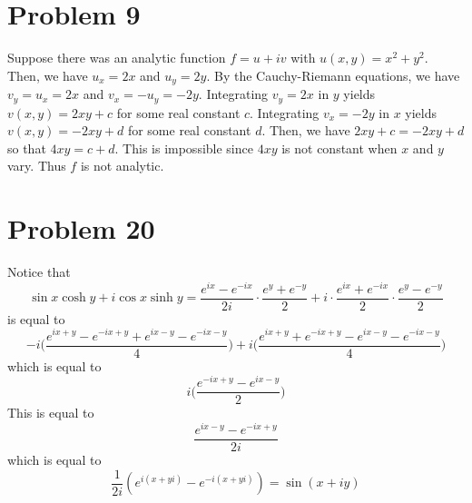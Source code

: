 \documentclass[12pt]{article}
\begin{document}
\section*{Problem 9}
Suppose there was an analytic function $f = u + iv$ with $u(x,y) = x^2 + y^2$. Then, we have $u_x = 2x$ and $u_y = 2y$. By the Cauchy-Riemann equations, we have $v_y = u_x = 2x$ and $v_x = -u_y = -2y$. Integrating $v_y = 2x$ in $y$ yields $v(x,y) = 2xy + c$ for some real constant $c$. Integrating $v_x = -2y$ in $x$ yields $v(x,y) = -2xy + d$ for some real constant $d$. Then, we have $2xy + c = -2xy + d$ so that $4xy = c+d$. This is impossible since $4xy$ is not constant when $x$ and $y$ vary. Thus $f$ is not analytic.
\newpage
\section*{Problem 20}
Notice that
\[
\sin x \cosh y + i \cos x \sinh y = \frac{e^{ix} - e^{-ix}}{2i} \cdot \frac{e^{y}+e^{-y}}{2} + i \cdot \frac{e^{ix} + e^{-ix}}{2} \cdot \frac{e^y - e^{-y}}{2} 
\] is equal to
\[
-i\bigg(\frac{e^{ix+y} - e^{-ix+y} + e^{ix-y} - e^{-ix-y}}{4}\bigg) + i\bigg(\frac{e^{ix+y} + e^{-ix+y} - e^{ix - y} - e^{-ix-y}}{4} \bigg)
\] which is equal to
\[
i\bigg(\frac{e^{-ix+y} - e^{ix-y}}{2}\bigg)
\] This is equal to
\[
\frac{e^{ix-y}-e^{-ix+y}}{2i}
\] which is equal to
\[
\frac{1}{2i}(e^{i(x+yi)} - e^{-i(x+yi)}) = \sin(x+iy)
\]
\end{document}
